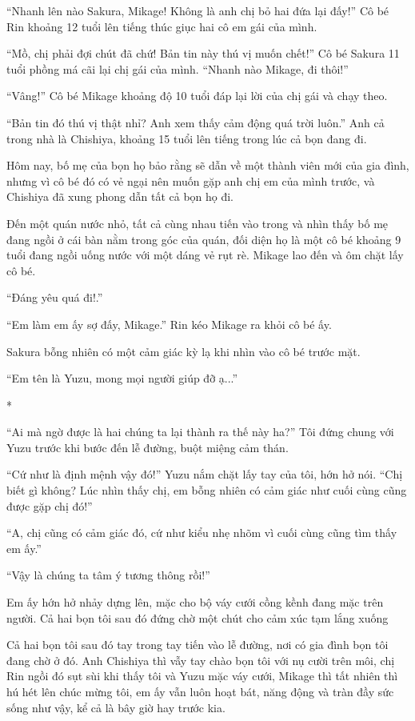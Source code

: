 {``Nhanh lên nào Sakura, Mikage! Không là anh chị bỏ hai đứa lại đấy!''
Cô bé Rin khoảng 12 tuổi lên tiếng thúc giục hai cô em gái của mình.

``Mồ, chị phải đợi chút đã chứ! Bản tin này thú vị muốn chết!'' Cô bé
Sakura 11 tuổi phồng má cãi lại chị gái của mình. ``Nhanh nào Mikage, đi
thôi!''

``Vâng!'' Cô bé Mikage khoảng độ 10 tuổi đáp lại lời của chị gái và chạy
theo.

``Bản tin đó thú vị thật nhỉ? Anh xem thấy cảm động quá trời luôn.'' Anh
cả trong nhà là Chishiya, khoảng 15 tuổi lên tiếng trong lúc cả bọn đang
đi.

Hôm nay, bố mẹ của bọn họ bảo rằng sẽ dẫn về một thành viên mới của gia
đình, nhưng vì cô bé đó có vẻ ngại nên muốn gặp anh chị em của mình
trước, và Chishiya đã xung phong dẫn tất cả bọn họ đi.

Đến một quán nước nhỏ, tất cả cùng nhau tiến vào trong và nhìn thấy bố
mẹ đang ngồi ở cái bàn nằm trong góc của quán, đối diện họ là một cô bé
khoảng 9 tuổi đang ngồi uống nước với một dáng vẻ rụt rè. Mikage lao đến
và ôm chặt lấy cô bé.

``Đáng yêu quá đi!.''

``Em làm em ấy sợ đấy, Mikage.'' Rin kéo Mikage ra khỏi cô bé ấy.

Sakura bỗng nhiên có một cảm giác kỳ lạ khi nhìn vào cô bé trước mặt.

``Em tên là Yuzu, mong mọi người giúp đỡ ạ...''

*

``Ai mà ngờ được là hai chúng ta lại thành ra thế này ha?'' Tôi đứng
chung với Yuzu trước khi bước đến lễ đường, buột miệng cảm thán.

``Cứ như là định mệnh vậy đó!'' Yuzu nắm chặt lấy tay của tôi, hớn hở
nói. ``Chị biết gì không? Lúc nhìn thấy chị, em bỗng nhiên có cảm giác
như cuối cùng cũng được gặp chị đó!''

``A, chị cũng có cảm giác đó, cứ như kiểu nhẹ nhõm vì cuối cùng cũng tìm
thấy em ấy.''

``Vậy là chúng ta tâm ý tương thông rồi!''

Em ấy hớn hở nhảy dựng lên, mặc cho bộ váy cưới cồng kềnh đang mặc trên
người. Cả hai bọn tôi sau đó đứng chờ một chút cho cảm xúc tạm lắng
xuống

Cả hai bọn tôi sau đó tay trong tay tiến vào lễ đường, nơi có gia đình
bọn tôi đang chờ ở đó. Anh Chishiya thì vẫy tay chào bọn tôi với nụ cười
trên môi, chị Rin ngồi đó sụt sùi khi thấy tôi và Yuzu mặc váy cưới,
Mikage thì tất nhiên thì hú hét lên chúc mừng tôi, em ấy vẫn luôn hoạt
bát, năng động và tràn đầy sức sống như vậy, kể cả là bây giờ hay trước
kia.

}
